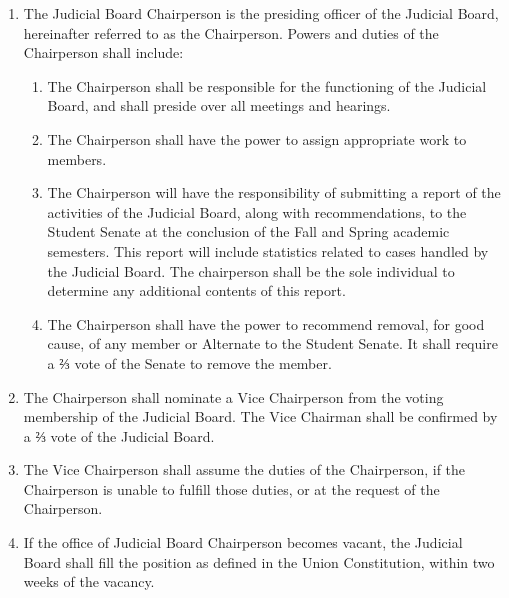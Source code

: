 \begin{enumerate}
\item The Judicial Board Chairperson is the presiding officer of the Judicial Board, hereinafter referred to as the Chairperson. Powers and duties of the Chairperson shall include:
  \begin{enumerate}
  \item The Chairperson shall be responsible for the functioning of the Judicial Board, and shall preside over all meetings and hearings.
  \item The Chairperson shall have the power to assign appropriate work to members.
  \item The Chairperson will have the responsibility of submitting a report of the activities of the Judicial Board, along with recommendations, to the Student Senate at the conclusion of the Fall and Spring academic semesters. This report will include statistics related to cases handled by the Judicial Board. The chairperson shall be the sole individual to determine any additional contents of this report.
  \item The Chairperson shall have the power to recommend removal, for good cause, of any member or Alternate to the Student Senate. It shall require a ⅔ vote of the Senate to remove the member.
  \end{enumerate}
\item The Chairperson shall nominate a Vice Chairperson from the voting membership of the Judicial Board. The Vice Chairman shall be confirmed by a ⅔ vote of the Judicial Board.
\item The Vice Chairperson shall assume the duties of the Chairperson, if the Chairperson is unable to fulfill those duties, or at the request of the Chairperson.
\item If the office of Judicial Board Chairperson becomes vacant, the Judicial Board shall fill the position as defined in the Union Constitution, within two weeks of the vacancy.
\end{enumerate}


